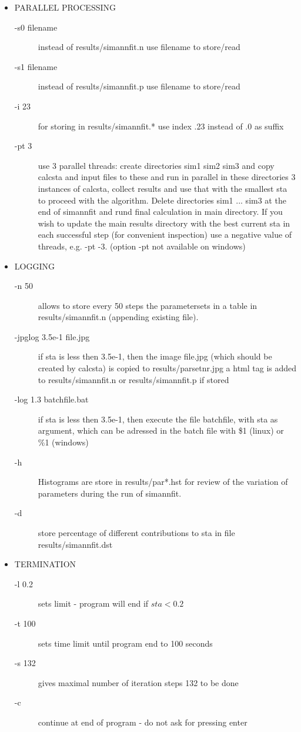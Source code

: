 \begin{itemize}
\begin{description}
	    - in this way a series of equally good solutions can be explored.
\end{description}
\item  PARALLEL PROCESSING
\begin{description}\item[-s0 filename] instead of results/simannfit.n use filename to store/read 
\item[-s1 filename] instead of results/simannfit.p use filename to store/read 
\item[-i 23] for storing in results/simannfit.* use index .23 instead of .0 as suffix 
\item[-pt 3] use 3 parallel threads: create directories sim1 sim2 sim3 and
            copy calcsta and input files to these and run in parallel in these
            directories 3 instances of calcsta, collect results and use that with
            the smallest sta to proceed with the algorithm.  Delete directories 
            sim1 ... sim3 at the end of simannfit and rund final calculation in
            main directory. If you wish to update the main results directory with the 
            best current sta in each successful step (for convenient
            inspection) use a negative value of threads, e.g. -pt -3.
            (option -pt not available on windows)
\end{description}
\item LOGGING 
\begin{description}
\item[-n 50]allows to store every 50 steps the parametersets in a table in  {\prg results/simannfit.n}
 (appending existing file).
\item[-jpglog 3.5e-1 file.jpg] if sta is less then 3.5e-1, then the image file.jpg 
            (which should be created by calcsta) is copied to results/parsetnr.jpg
            a html tag is added to results/simannfit.n or results/simannfit.p if 
	    stored
\item[-log 1.3 batchfile.bat] if sta is less then 3.5e-1, then execute the file 
             batchfile, with sta as argument, which can be adressed in the batch
	     file with \$1 (linux) or  \%1 (windows)
\item[-h]       Histograms are store in results/par*.hst for review of the variation 
             of parameters during the run of simannfit. 
\item[-d ]      store percentage of different contributions to sta in file results/simannfit.dst 
\end{description}
\item TERMINATION 
\begin{description}
\item[-l 0.2] sets limit - program will end if $sta<0.2$
\item[-t 100] sets time limit until program end to 100 seconds
\item[-s 132] gives maximal number of iteration steps 132 to be done
\item[-c] continue at end of program - do not ask for pressing enter 
\end{description}
\end{itemize}
